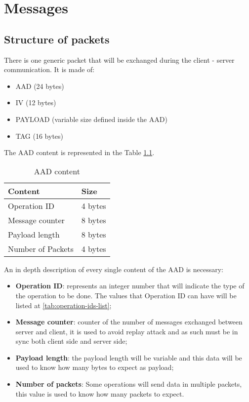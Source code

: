 
\chapter{Messages}
\label{cap:messages}

\section{Structure of packets}

There is one generic packet that will be exchanged during the client - server communication. It is made of: \newline{}
\begin{itemize}
	\item AAD (24 bytes)
	\item IV (12 bytes)
	\item PAYLOAD (variable size defined inside the AAD)
	\item TAG (16 bytes)
\end{itemize}
The AAD content is represented in the Table \ref{tab:AAD-content}.
\begin{longtable}{|p{}|p{}|}
	\caption{AAD content}
	\label{AAD content} 
	\label{tab:AAD-content} \\
	\hline
	\textbf{Content} & \textbf{Size} \\
	\hline
	Operation ID & 4 bytes \\
	\hline
	Message counter & 8 bytes \\
	\hline
	Payload length & 8 bytes \\
	\hline
	Number of Packets & 4 bytes \\
	\hline
\end{longtable}%

An in depth description of every single content of the AAD is necessary:

\begin{itemize}
	\item \textbf{Operation ID}: represents an integer number that will indicate the type of the operation to be done. The values that Operation ID can have will be listed at \ref{tab:operation-ids-list};
	\item \textbf{Message counter}: counter of the number of messages exchanged between server and client, it is used to avoid replay attack and as such must be in sync both client side and server side;
	\item \textbf{Payload length}: the payload length will be variable and this data will be used to know how many bytes to expect as payload;
	\item \textbf{Number of packets}: Some operations will send data in multiple packets, this value is used to know how many packets to expect.
\end{itemize}

